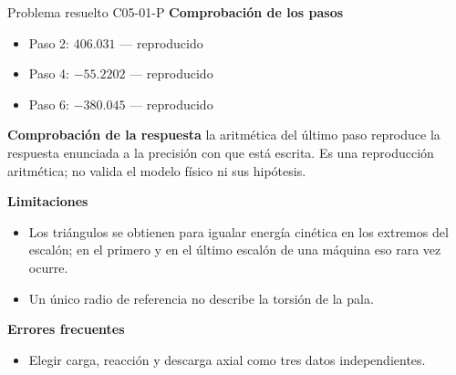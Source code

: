 \documentclass[10pt,openany]{book}
\begin{document}
\begin{studiumworked}{Problema resuelto C05-01-P}
\noindent\textbf{Comprobación de los pasos}
\begin{itemize}
\item Paso 2: $406.031$ — reproducido
\item Paso 4: $-55.2202$ — reproducido
\item Paso 6: $-380.045$ — reproducido
\end{itemize}

\noindent\textbf{Comprobación de la respuesta} la aritmética del último paso reproduce la respuesta enunciada a la precisión con que está escrita. Es una reproducción aritmética; no valida el modelo físico ni sus hipótesis.

\noindent\textbf{Limitaciones}
\begin{itemize}
\item Los triángulos se obtienen para igualar energía cinética en los extremos del escalón; en el primero y en el último escalón de una máquina eso rara vez ocurre.
\item Un único radio de referencia no describe la torsión de la pala.
\end{itemize}

\noindent\textbf{Errores frecuentes}
\begin{itemize}
\item Elegir carga, reacción y descarga axial como tres datos independientes.
\end{itemize}
\end{studiumworked}
\end{document}
